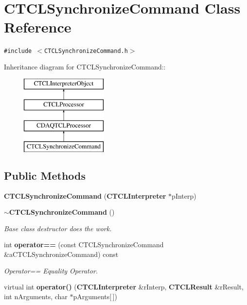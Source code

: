 \section{CTCLSynchronize\-Command  Class Reference}
\label{classCTCLSynchronizeCommand}
{\tt \#include $<$CTCLSynchronize\-Command.h$>$}

Inheritance diagram for CTCLSynchronize\-Command::\begin{figure}[H]
\begin{center}
\leavevmode
\includegraphics[height=4cm]{classCTCLSynchronizeCommand}
\end{center}
\end{figure}
\subsection*{Public Methods}
\begin{CompactItemize}
\item 
{\bf CTCLSynchronize\-Command} ({\bf CTCLInterpreter} $\ast$p\-Interp)
\item 
{\bf $\sim$CTCLSynchronize\-Command} ()
\begin{CompactList}\small\item\em Base class destructor does the work.\item\end{CompactList}\item 
int {\bf operator==} (const CTCLSynchronize\-Command \&a\-CTCLSynchronize\-Command) const
\begin{CompactList}\small\item\em Operator== Equality Operator.\item\end{CompactList}\item 
virtual int {\bf operator()} ({\bf CTCLInterpreter} \&r\-Interp, {\bf CTCLResult} \&r\-Result, int n\-Arguments, char $\ast$p\-Arguments[$\,$])
\end{CompactItemize}

